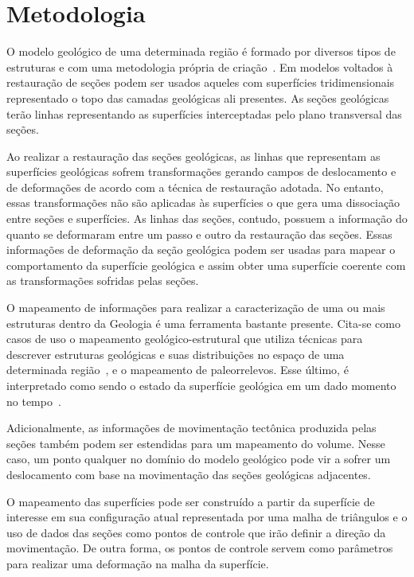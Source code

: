 \section{Metodologia}

O modelo geológico de uma determinada região é formado por diversos tipos de estruturas e com uma metodologia própria de criação~\cite{Rodrigues}. Em modelos voltados à restauração de seções podem ser usados aqueles com superfícies tridimensionais representado o topo das camadas geológicas ali presentes. As seções geológicas terão linhas representando as superfícies interceptadas pelo plano transversal das seções.

Ao realizar a restauração das seções geológicas, as linhas que representam as superfícies geológicas sofrem transformações gerando campos de deslocamento e de deformações de acordo com a técnica de restauração adotada. No entanto, essas transformações não são aplicadas às superfícies o que gera uma dissociação entre seções e superfícies. As linhas das seções, contudo, possuem a informação do quanto se deformaram entre um passo e outro da restauração das seções. Essas informações de deformação da seção geológica podem ser usadas para mapear o comportamento da superfície geológica e assim obter uma superfície coerente com as transformações sofridas pelas seções.

O mapeamento de informações para realizar a caracterização de uma ou mais estruturas dentro da Geologia é uma ferramenta bastante presente. Cita-se como casos de uso o mapeamento geológico-estrutural que utiliza técnicas para descrever estruturas geológicas e suas distribuições no espaço de uma determinada região~\cite{Borges, Felipe}, e o mapeamento de paleorrelevos. Esse último, é interpretado como sendo o estado da superfície geológica em um dado momento no tempo~\cite{Archela}.

Adicionalmente, as informações de movimentação tectônica produzida pelas seções também podem ser estendidas para um mapeamento do volume. Nesse caso, um ponto qualquer no domínio do modelo geológico pode vir a sofrer um deslocamento com base na movimentação das seções geológicas adjacentes.

O mapeamento das superfícies pode ser construído a partir da superfície de interesse em sua configuração atual representada por uma malha de triângulos e o uso de dados das seções como pontos de controle que irão definir a direção da movimentação. De outra forma, os pontos de controle servem como parâmetros para realizar uma deformação na malha da superfície.

